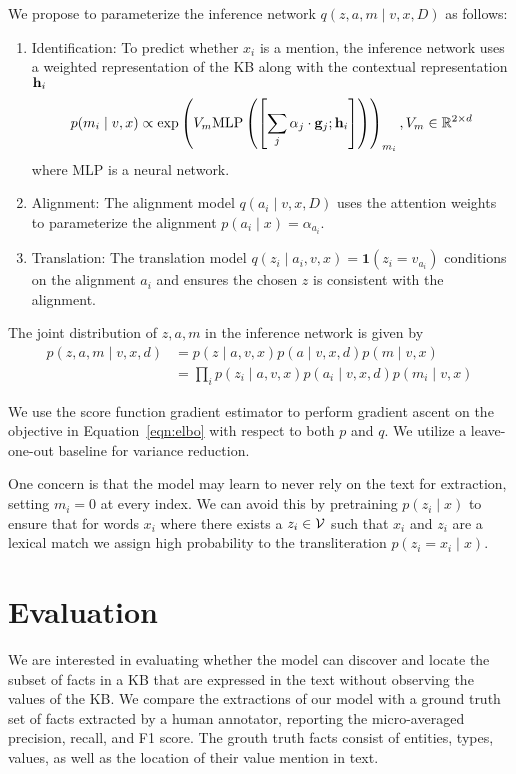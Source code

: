 \documentclass[12pt]{article}
\begin{document}
We propose to parameterize the inference network $q(z,a,m\mid v,x,D)$ as follows:
\begin{enumerate}
\item Identification: To predict whether $x_i$ is a mention,
    the inference network uses a weighted representation of the KB
    along with the contextual representation $\mathbf{h}_i$
    \begin{equation}
    p(m_i \mid v,x) \propto
    \exp\left(V_m
    \textrm{MLP}\left(\left[\sum_j \alpha_j \cdot \mathbf{g}_j; \mathbf{h}_i\right]\right)\right)_{m_i},
    V_m \in \mathbb{R}^{2 \times d}
    \end{equation}
    where MLP is a neural network.
\item Alignment: The alignment model $q(a_i \mid v,x,D)$
    uses the attention weights to parameterize the alignment
    $p(a_i \mid x) = \alpha_{a_i}$.
\item Translation: The translation model
    $q(z_i \mid a_i,v,x) = \mathbf{1}(z_i = v_{a_i})$
    conditions on the alignment $a_i$ and ensures the chosen $z$ is consistent
    with the alignment. 
\end{enumerate}

The joint distribution of $z,a,m$ in the inference network is given by
\begin{equation}
\label{eqn:elbo}
\begin{aligned}
p(z,a,m\mid v,x,d) &= p(z \mid a,v,x)p(a\mid v,x,d)p(m \mid v,x)\\
&= \prod_i p(z_i \mid a,v,x)p(a_i \mid v,x,d)p(m_i \mid v,x)
\end{aligned}
\end{equation}

We use the score function gradient estimator
to perform gradient ascent on the objective
in Equation~\ref{eqn:elbo} with respect to both $p$ and $q$.
We utilize a leave-one-out baseline for variance reduction.

One concern is that the model may learn to never rely on the text for extraction,
setting $m_i = 0$ at every index.
We can avoid this by pretraining $p(z_i \mid x)$ to ensure that for words $x_i$
where there exists a $z_i \in \mathcal{V}$ such that $x_i$ and $z_i$ are a lexical match
we assign high probability to the transliteration $p(z_i = x_i \mid x)$.

\section{Evaluation}
We are interested in evaluating whether the model can discover
and locate the subset of facts in a KB that are expressed in the text
without observing the values of the KB.
We compare the extractions of our model with a ground truth set of facts extracted by a human annotator,
reporting the micro-averaged precision, recall, and F1 score.
The grouth truth facts consist of entities, types, values, as well as the location of their
value mention in text.
\end{document}
